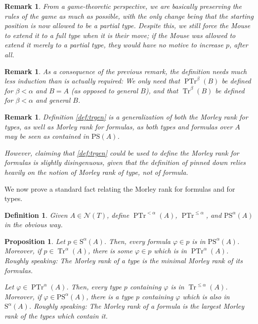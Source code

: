 \documentclass{article}
\newtheorem{prop}[theorem]{Proposition}
\newtheorem{remark}[theorem]{Remark}
\newtheorem{definition}[theorem]{Definition}
\theoremstyle{nonumberplain}
\newcommand{\calN}{\mathcal{N}}
\newcommand{\Stone}{\mathrm{S}}
\newcommand{\PStone}{\mathrm{PS}}
\DeclareMathOperator{\Tr}{Tr}
\DeclareMathOperator{\PTr}{PTr}
\begin{document}
\begin{remark}
From a game-theoretic perspective, we are basically preserving the rules of the game as much as possible, with the only change being that the starting position is now allowed to be a partial type. Despite this, we still force the Mouse to extend it to a full type when it is their move; if the Mouse was allowed to extend it merely to a partial type, they would have no motive to increase $p$, after all.
\end{remark}

\begin{remark}
As a consequence of the previous remark, the definition needs much less induction than is actually required: We only need that $\PTr^\beta(B)$ be defined for $\beta < \alpha$ and $B = A$ (as opposed to general $B$), and that $\Tr^\beta(B)$ be defined for $\beta < \alpha$ and general $B$.
\end{remark}

\begin{remark}
Definition \ref{def:trgen} is a generalization of both the Morley rank for types, as well as Morley rank for formulas, as both types and formulas over $A$ may be seen as contained in $\PStone(A)$.

However, claiming that \ref{def:trgen} could be used to define the Morley rank for formulas is slightly disingenuous, given that the definition of pinned down relies heavily on the notion of Morley rank of type, not of formula.
\end{remark}

We now prove a standard fact relating the Morley rank for formulas and for types.

\begin{definition}
Given $A \in \calN(T)$, define $\PTr^{<\alpha}(A)$, $\PTr^{\leq\alpha}$, and $\PStone^\alpha(A)$ in the obvious way.
\end{definition}

\begin{prop}
Let $p \in \Stone^\alpha(A)$. Then, every formula $\varphi \in p$ is in $\PStone^\alpha(A)$. Moreover, if $p \in \Tr^\alpha(A)$, there is some $\varphi \in p$ which is in $\PTr^\alpha(A)$. Roughly speaking: The Morley rank of a type is the minimal Morley rank of its formulas.

Let $\varphi \in \PTr^\alpha(A)$. Then, every type $p$ containing $\varphi$ is in $\Tr^{\leq\alpha}(A)$. Moreover, if $\varphi \in \PStone^\alpha(A)$, there is a type $p$ containing $\varphi$ which is also in $\Stone^\alpha(A)$. Roughly speaking: The Morley rank of a formula is the largest Morley rank of the types which contain it.
\end{prop}
\end{document}
